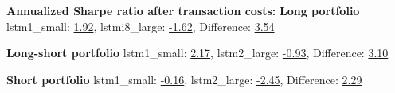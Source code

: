 \indent\newline
\indent\newline
\textbf{Annualized Sharpe ratio after transaction costs:}
\indent\newline
\textbf{Long portfolio} 
\indent\newline
lstm1\_small: \underline{1.92},  lstmi8\_large: \underline{-1.62},  Difference: \underline{3.54}

\indent\newline
\textbf{Long-short portfolio}
\indent\newline
lstm1\_small: \underline{2.17},  lstm2\_large: \underline{-0.93},  Difference: \underline{3.10} 
  
\indent\newline
\textbf{Short portfolio} 
\indent\newline
lstm1\_small: \underline{-0.16},  lstm2\_large: \underline{-2.45},  Difference: \underline{2.29}  